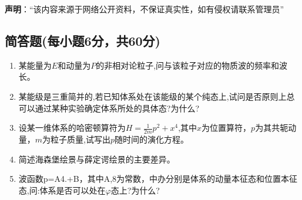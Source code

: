 
\textbf{声明}：“该内容来源于网络公开资料，不保证真实性，如有侵权请联系管理员”

\subsection{简答题(每小题6分，共60分)}
\begin{enumerate}
\item 某能量为$E$和动量为$P$的非相对论粒子,问与该粒子对应的物质波的频率和波长。
\item 某能级是三重简并的,若已知体系处在该能级的某个纯态上,试问是否原则上总可以通过某种实验确定体系所处的具体态?为什么?
\item 设某一维体系的哈密顿算符为$H=\frac{1}{2m}p^2+x^4$,其中$x$为位置算符，$p$为其共轭动量，$m$为粒子质量,试写出$p$随时间的演化方程。
\item 简述海森堡绘景与薛定谔绘景的主要差异。
\item 波函数p=A4.+B，其中A,8为常数，中办分别是体系的动量本征态和位置本征态,问:体系是否可以处在$\varphi$态上?为什么?
\end{enumerate}
